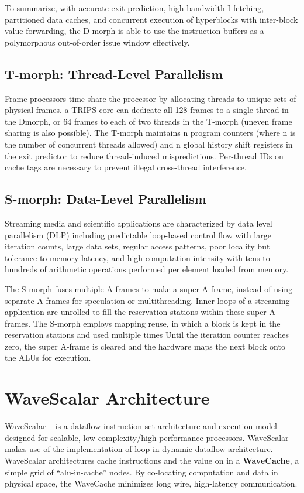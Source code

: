 \documentclass[UTF8,12pt,a4paper]{article}
\begin{document}
To summarize, with accurate exit prediction, high-bandwidth I-fetching,
partitioned data caches, and concurrent execution of hyperblocks with inter-block value forwarding,
the D-morph is able to use the instruction buffers as a polymorphous out-of-order issue window effectively.

\subsection{T-morph: Thread-Level Parallelism}
Frame processors time-share the processor by allocating threads to unique sets of physical frames.
a TRIPS core can dedicate all 128 frames to a single thread in the Dmorph,
or 64 frames to each of two threads in the T-morph (uneven frame sharing is also possible).
The T-morph maintains n program counters (where n is the number of concurrent threads allowed)
and n global history shift registers in the exit predictor to reduce thread-induced mispredictions.
Per-thread IDs on cache tags are necessary to prevent illegal cross-thread interference.

\subsection{S-morph: Data-Level Parallelism}
Streaming media and scientific applications are characterized by data level parallelism (DLP)
including predictable loop-based control flow with large iteration counts,
large data sets, regular access patterns, poor locality but tolerance to memory latency,
and high computation intensity with tens to hundreds of arithmetic operations performed per element loaded from memory.

The S-morph fuses multiple A-frames to make a super A-frame,
instead of using separate A-frames for speculation or multithreading.
Inner loops of a streaming application are unrolled
to fill the reservation stations within these super A-frames.
The S-morph employs mapping reuse, in which a block is kept in the reservation stations and used multiple times
Until the iteration counter reaches zero, the super A-frame is cleared
and the hardware maps the next block onto the ALUs for execution.

\clearpage

\section{WaveScalar Architecture}
WaveScalar ~\cite{DBLP:conf/micro/SwansonMSO03}\cite{DBLP:journals/tocs/SwansonSMPPMOE07}
is a dataflow instruction set architecture and execution model designed for scalable,
low-complexity/high-performance processors.
WaveScalar makes use of the implementation of loop in dynamic dataflow architecture.
WaveScalar architectures cache instructions and the value on in a \textbf{WaveCache},
a simple grid of ``alu-in-cache'' nodes.
By co-locating computation and data in physical space,
the WaveCache minimizes long wire, high-latency communication.
\end{document}
